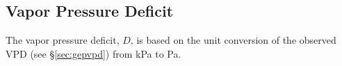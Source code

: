 \subsection{Vapor Pressure Deficit}
\label{sec:d}
The vapor pressure deficit, $D$, is based on the unit conversion of the observed VPD (see \S \ref{sec:gepvpd}) from kPa to Pa.

